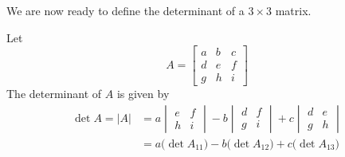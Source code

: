 \documentclass{ximera}
\begin{document}
We are now ready to define the determinant of a $3\times 3$ matrix.
\begin{definition}\label{def:threebythreedet}
Let
$$A=\begin{bmatrix}a&b&c\\d&e&f\\g&h&i\end{bmatrix}$$
The determinant of $A$ is given by
\begin{align*}\det{A}=|A|&=a\begin{vmatrix}e&f\\h&i\end{vmatrix}-b\begin{vmatrix}d&f\\g&i\end{vmatrix}+c\begin{vmatrix}d&e\\g&h\end{vmatrix}\\
&=a\big(\det{A_{11}}\big)-b\big(\det{A_{12}}\big)+c\big(\det{A_{13}}\big)
\end{align*}
\end{definition}
\end{document}
